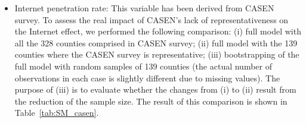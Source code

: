 \documentclass[onecolumn]{article}
\begin{document}
\begin{itemize}
\item Internet penetration rate: This variable has been derived from CASEN survey. To assess the real impact of CASEN's lack of representativeness on the Internet effect, we performed the following comparison: (i) full model with all the 328 counties comprised in CASEN survey; (ii) full model with the 139 counties where the CASEN survey is representative; (iii) bootstrapping of the full model with random samples of 139 counties (the actual number of observations in each case is slightly different due to missing values). The purpose of (iii) is to evaluate whether the changes from (i) to (ii) result from the reduction of the sample size. The result of this comparison is shown in Table~\ref{tab:SM_casen}.
\end{itemize}




\end{document}
